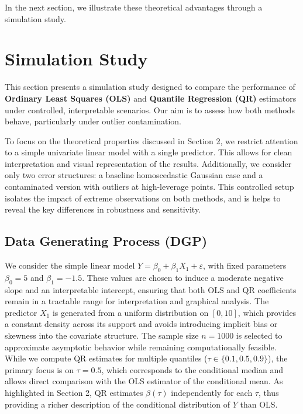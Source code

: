 \documentclass[fleqn,10pt]{latex/stylish_article} %
\begin{document}
In the next section, we illustrate these theoretical advantages through a simulation study.

\section{Simulation Study}\label{simulation-study}

This section presents a simulation study designed to compare the performance of \textbf{Ordinary Least Squares (OLS)} and \textbf{Quantile Regression (QR)} estimators under controlled, interpretable scenarios. Our aim is to assess how both methods behave, particularly under outlier contamination.

To focus on the theoretical properties discussed in Section 2, we restrict attention to a simple univariate linear model with a single predictor. This allows for clean interpretation and visual representation of the results. Additionally, we consider only two error structures: a baseline homoscedastic Gaussian case and a contaminated version with outliers at high-leverage points. This controlled setup isolates the impact of extreme observations on both methods, and is helps to reveal the key differences in robustness and sensitivity.

\subsection{Data Generating Process (DGP)}\label{data-generating-process-dgp}

We consider the simple linear model \(Y = \beta_0 + \beta_1 X_1 + \varepsilon\), with fixed parameters \(\beta_0 = 5\) and \(\beta_1 = -1.5\). These values are chosen to induce a moderate negative slope and an interpretable intercept, ensuring that both OLS and QR coefficients remain in a tractable range for interpretation and graphical analysis. The predictor \(X_1\) is generated from a uniform distribution on \([0,10]\), which provides a constant density across its support and avoids introducing implicit bias or skewness into the covariate structure. The sample size \(n = 1000\) is selected to approximate asymptotic behavior while remaining computationally feasible. While we compute QR estimates for multiple quantiles (\(\tau \in \{0.1, 0.5, 0.9\}\)), the primary focus is on \(\tau = 0.5\), which corresponds to the conditional median and allows direct comparison with the OLS estimator of the conditional mean. As highlighted in Section 2, QR estimates \(\beta(\tau)\) independently for each \(\tau\), thus providing a richer description of the conditional distribution of \(Y\) than OLS.
\end{document}
